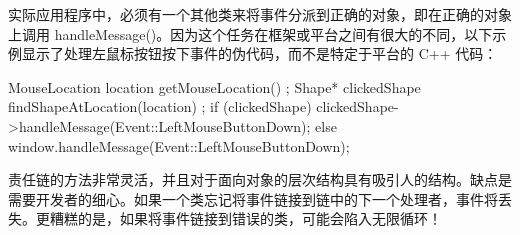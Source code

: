 实际应用程序中，必须有一个其他类来将事件分派到正确的对象，即在正确的对象上调用 handleMessage()。因为这个任务在框架或平台之间有很大的不同，以下示例显示了处理左鼠标按钮按下事件的伪代码，而不是特定于平台的 C++ 代码：

\begin{cpp}
MouseLocation location { getMouseLocation() };
Shape* clickedShape { findShapeAtLocation(location) };
if (clickedShape) {
    clickedShape->handleMessage(Event::LeftMouseButtonDown);
} else {
    window.handleMessage(Event::LeftMouseButtonDown);
}
\end{cpp}

责任链的方法非常灵活，并且对于面向对象的层次结构具有吸引人的结构。缺点是需要开发者的细心。如果一个类忘记将事件链接到链中的下一个处理者，事件将丢失。更糟糕的是，如果将事件链接到错误的类，可能会陷入无限循环！



















